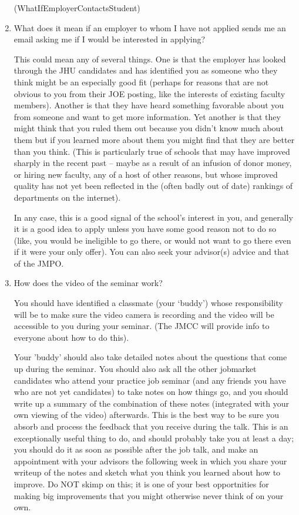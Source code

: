 \documentclass{econtex}
\providecommand\phantomsection{}
\begin{document}
\begin{enumerate}
\ifdvi\phantomsection\hypertarget{WhatIfEmployerContactsStudent}{(WhatIfEmployerContactsStudent)}\fi
\item What does it mean if an employer to whom I have not applied sends me an email asking me if I would be interested in applying?

This could mean any of several things.  One is that the employer has looked through the JHU candidates and 
has identified you as someone who they think might be an especially good fit (perhaps for reasons that are 
not obvious to you from their JOE posting, like the interests of existing faculty members).  Another is that they
have heard something favorable about you from someone and want to get more information.  Yet another is that they
might think that you ruled them out because you didn't know much about them but if you learned more about them 
you might find that they are better than you think.  (This is particularly true of schools that may have improved sharply 
in the recent past -- maybe as a result of an infusion of donor money, or hiring new faculty, any of a host of other reasons, but whose 
improved quality has not yet been reflected in the (often badly out of date) rankings of departments on the internet).

In any case, this is a good signal of the school's interest in you, and generally it is a good idea to apply
unless you have some good reason not to do so (like, you would be ineligible to go there, or would not want to 
go there even if it were your only offer).  You can also seek your advisor(s) advice and that of the JMPO.


\item How does the video of the seminar work?
  
  You should have identified a classmate (your `buddy') whose
  responsibility will be to make sure the video camera is recording
  and the video will be accessible to you during your seminar.  (The
  JMCC will provide info to everyone about how to do this).  

  Your 'buddy' should also take detailed notes about the questions
  that come up during the seminar.  You should also ask all the other
  jobmarket candidates who attend your practice job seminar (and any
  friends you have who are not yet candidates) to take notes on how
  things go, and you should write up a summary of the combination of
  these notes (integrated with your own viewing of the video)
  afterwards.  This is the best way to be sure you absorb and process
  the feedback that you receive during the talk.  This is an
  exceptionally useful thing to do, and should probably take you at least
  a day; you should do it as soon as possible after the job talk, and
  make an appointment with your advisors the following week in which
  you share your writeup of the notes and sketch what you think you
  learned about how to improve.  Do NOT skimp on this; it is one of
  your best opportnities for making big improvements that you might
  otherwise never think of on your own.


\end{enumerate}
\end{document}
